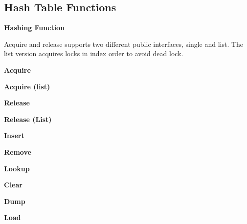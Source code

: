 \documentclass[11pt,letterpaper]{article}
\begin{document}
\subsection{Hash Table Functions}
\begin{center}

\textbf{\footnotesize{Hashing Function}}
\end{center}
\pagebreak
Acquire and release supports two different public interfaces, single and list. The list
version acquires locks in index order to avoid dead lock.
\begin{center}

\textbf{\footnotesize{Acquire}}
\end{center}
\begin{center}

\textbf{\footnotesize{Acquire (list)}}
\end{center}
\begin{center}

\textbf{\footnotesize{Release}}
\end{center}
\begin{center}

\textbf{\footnotesize{Release (List)}}
\end{center}
\begin{center}

\textbf{\footnotesize{Insert}}
\end{center}
\begin{center}

\textbf{\footnotesize{Remove}}
\end{center}
\begin{center}

\textbf{\footnotesize{Lookup}}
\end{center}
\begin{center}

\textbf{\footnotesize{Clear}}
\end{center}
\begin{center}

\textbf{\footnotesize{Dump}}
\end{center}
\begin{center}

\textbf{\footnotesize{Load}}
\end{center}
\end{document}
